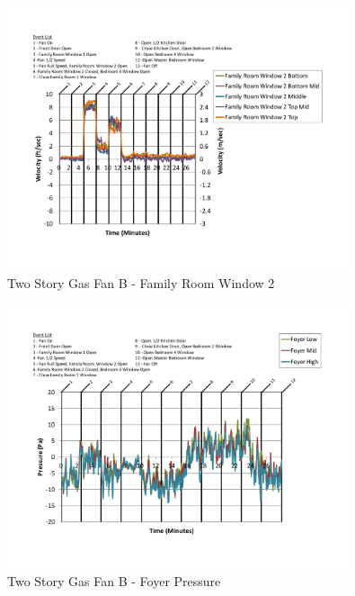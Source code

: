 \documentclass{article}
\begin{document}
\begin{appendices}
	\begin{figure}[H]
		\centering
		\includegraphics[height=3.05in,trim=0.67in 1.1in 0.67in 0.8in,clip=true]{0_Images/Results_Charts/ColdFlow/Two_Story/Gas/B/Family_Room_Window_2.pdf}
		\caption{Two Story Gas Fan B - Family Room Window 2}
	\end{figure}
 

	\begin{figure}[H]
		\centering
		\includegraphics[height=3.05in,trim=0.67in 1.1in 0.67in 0.8in,clip=true]{0_Images/Results_Charts/ColdFlow/Two_Story/Gas/B/Foyer_Pressure.pdf}
		\caption{Two Story Gas Fan B - Foyer Pressure}
	\end{figure}
 
	\clearpage


\end{appendices}
\end{document}
